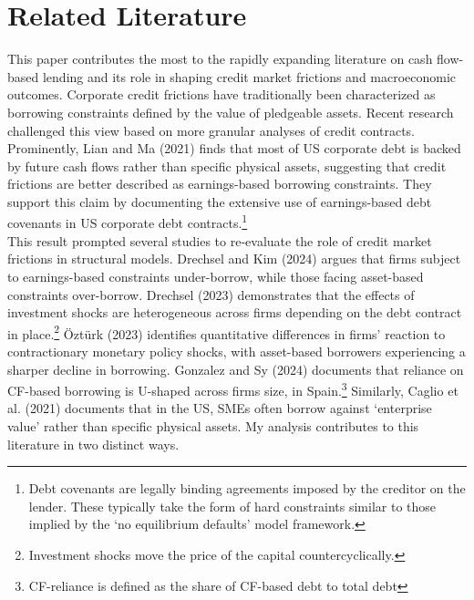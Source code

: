 \documentclass[12pt]{article}
\begin{document}
\section{Related Literature \label{sec:literature}} 
This paper contributes the most to the rapidly expanding literature on cash flow-based lending and its role in shaping credit market frictions and macroeconomic outcomes. Corporate credit frictions have traditionally been characterized as borrowing constraints defined by the value of pledgeable assets. Recent research challenged this view based on more granular analyses of credit contracts. Prominently, Lian and Ma (2021) finds that most of US corporate debt is backed by future cash flows rather than specific physical assets, suggesting that credit frictions are better described as earnings-based borrowing constraints. They support this claim by documenting the extensive use of earnings-based debt covenants in US corporate debt contracts.\footnote{Debt covenants are legally binding agreements imposed by the creditor on the lender. These typically take the form of hard constraints similar to those implied by the `no equilibrium defaults' model framework.} \vspace{3mm} \\
This result prompted several studies to re-evaluate the role of credit market frictions in structural models. Drechsel and Kim (2024) argues that firms subject to earnings-based constraints under-borrow, while those facing asset-based constraints over-borrow. Drechsel (2023) demonstrates that the effects of investment shocks are heterogeneous across firms depending on the debt contract in place.\footnote{Investment shocks move the price of the capital countercyclically.} Öztürk (2023) identifies quantitative differences in firms' reaction to contractionary monetary policy shocks, with asset-based borrowers experiencing a sharper decline in borrowing. Gonzalez and Sy (2024) documents that reliance on CF-based borrowing is U-shaped across firms size, in Spain.\footnote{CF-reliance is defined as the share of CF-based debt to total debt} Similarly, Caglio et al. (2021) documents that in the US, SMEs often borrow against `enterprise value' rather than specific physical assets. My analysis contributes to this literature in two distinct ways. \vspace{3mm} \\
\end{document}
